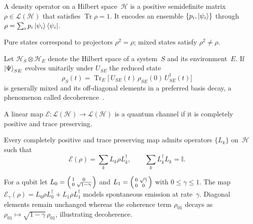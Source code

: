 \begin{definition}\label{def:density}
	A density operator on a Hilbert space~$\mathcal H$ is a positive semidefinite matrix $\rho\in\mathcal L(\mathcal H)$ that satisfies $\operatorname{Tr}\rho=1$.  
	It encodes an ensemble $\{p_{i},\ket{\psi_{i}}\}$ through $\rho=\sum_{i}p_{i}\ket{\psi_{i}}\bra{\psi_{i}}$.
\end{definition}

Pure states correspond to projectors $\rho^{2}=\rho$; mixed states satisfy $\rho^{2}\neq\rho$.


Let $\mathcal H_{S}\otimes\mathcal H_{E}$ denote the Hilbert space of a system~$S$ and its environment~$E$.  
If $\ket{\Psi}_{SE}$ evolves unitarily under $U_{SE}$ the reduced state
\[
	\rho_{S}(t)=\operatorname{Tr}_{E}\bigl[\,U_{SE}(t)\,\rho_{SE}(0)\,U_{SE}^{\dagger}(t)\bigr]
\]
is generally mixed and its off-diagonal elements in a preferred basis decay, a phenomenon called decoherence~\cite{Zurek2003,Schlosshauer2005}.  

\begin{definition}\label{def:channel}
	A linear map $\mathcal E:\mathcal L(\mathcal H)\to\mathcal L(\mathcal H)$ is a quantum channel if it is completely positive and trace preserving.
\end{definition}

\begin{proposition}\label{prop:kraus}
	Every completely positive and trace preserving map admits operators $\{L_{k}\}$ on~$\mathcal H$ such that
	\[
		\mathcal E(\rho)=\sum_{k}L_{k}\rho L_{k}^{\dagger},
		\qquad
		\sum_{k}L_{k}^{\dagger}L_{k}=\mathbb I .
	\]
\end{proposition}

\begin{example}\label{ex:amplitude_damp}
	For a qubit let $L_{0}=\begin{psmallmatrix}1&0\\0&\sqrt{1-\gamma}\end{psmallmatrix}$ and
	$L_{1}=\begin{psmallmatrix}0&\sqrt{\gamma}\\0&0\end{psmallmatrix}$ with $0\le\gamma\le1$.  
	The map $\mathcal E_{\gamma}(\rho)=L_{0}\rho L_{0}^{\dagger}+L_{1}\rho L_{1}^{\dagger}$ models spontaneous emission at rate~$\gamma$.  
	Diagonal elements remain unchanged whereas the coherence term $\rho_{01}$ decays as $\rho_{01}\mapsto\sqrt{1-\gamma}\,\rho_{01}$, illustrating decoherence.
\end{example}


